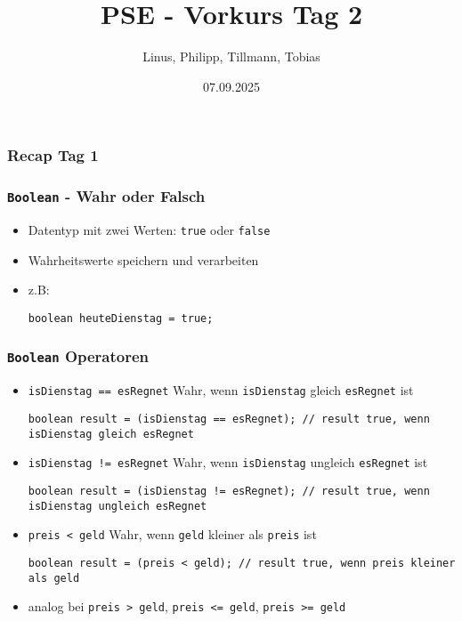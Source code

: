 \documentclass{../../presentation}
\title{PSE - Vorkurs Tag 2}
\author{Linus, Philipp, Tillmann, Tobias}
\institute{FIUS - Fachgruppe Informatik Universität Stuttgart}
\date{07.09.2025}
\begin{document}
\begin{frame}
  \titlepage
\end{frame}

\begin{frame}
  \listoftodos
\end{frame}

\begin{frame}
  \frametitle{Recap Tag 1}
\end{frame}


\begin{frame}[fragile]
  \frametitle{\texttt{Boolean} - Wahr oder Falsch}
  \begin{itemize}
    \item Datentyp mit zwei Werten: \texttt{true} oder \texttt{false}
    \item Wahrheitswerte speichern und verarbeiten

    \item z.B:
          \begin{verbatim}
boolean heuteDienstag = true;
    \end{verbatim}

  \end{itemize}
\end{frame}



\begin{frame}[fragile]
  \frametitle{\texttt{Boolean} Operatoren}


  \begin{itemize}
    \item<1->\texttt{isDienstag == esRegnet} \quad Wahr, wenn \texttt{isDienstag} gleich \texttt{esRegnet} ist
          \begin{verbatim}
boolean result = (isDienstag == esRegnet); // result true, wenn isDienstag gleich esRegnet
    \end{verbatim}

    \item<2->\texttt{isDienstag != esRegnet} \quad Wahr, wenn \texttt{isDienstag} ungleich \texttt{esRegnet} ist
          \begin{verbatim}
boolean result = (isDienstag != esRegnet); // result true, wenn isDienstag ungleich esRegnet
    \end{verbatim}

    \item<3->\texttt{preis < geld} \quad Wahr, wenn \texttt{geld} kleiner als \texttt{preis} ist
          \begin{verbatim}
boolean result = (preis < geld); // result true, wenn preis kleiner als geld
    \end{verbatim}

    \item<4->analog bei \texttt{preis > geld}, \texttt{preis <= geld}, \texttt{preis >= geld} \quad
  \end{itemize}
\end{frame}
\end{document}
